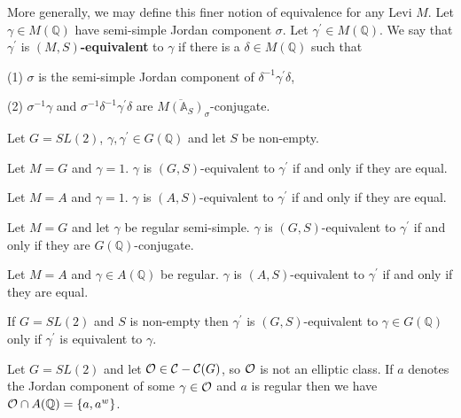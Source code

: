 More generally, we may define this
finer notion of equivalence for any Levi $M$. Let
$\gamma \in M({\mathbb{Q}})$ have semi-simple Jordan
component $\sigma$. Let $\gamma ^{\prime }\in M({\mathbb{Q}})$.
We say that $\gamma ^{\prime }$
is $(M,S)${\bf -equivalent} to $\gamma $ if there is a
$\delta \in M({\mathbb{Q}})$ such that

(1) $\sigma $ is the semi-simple Jordan component of
$\delta ^{-1}\gamma^{\prime }\delta $,

(2) $\sigma ^{-1}\gamma $ and $\sigma ^{-1}\delta ^{-1}
\gamma ^{\prime}\delta $ are
$\overline{M({\mathbb{A}}_{S})}_\sigma$-conjugate.

\begin{example}
Let $G=SL(2)$, $\gamma,\gamma^{\prime}\in G({\mathbb{Q}})$
and let $S$ be non-empty.

Let $M=G$ and $\gamma =1$. $\gamma$ is $(G,S)$-equivalent to
$\gamma^{\prime}$ if and only if they are equal.

Let $M=A$ and $\gamma =1$. $\gamma$ is $(A,S)$-equivalent to
$\gamma^{\prime}$ if and only if they are equal.

Let $M=G$ and let $\gamma $ be regular semi-simple.
$\gamma$ is $(G,S)$-equivalent to
$\gamma^{\prime}$ if and only if they are $G({\mathbb{Q}})$-conjugate.

Let $M=A$ and $\gamma \in A({\mathbb{Q}})$ be regular.
$\gamma$ is $(A,S)$-equivalent to
$\gamma^{\prime}$ if and only if they are equal.
\end{example}

\begin{lemma}
If $G=SL(2)$ and $S$ is non-empty then
$\gamma^{\prime}$ is $(G,S)$-equivalent to $\gamma\in G({\mathbb{Q}})$ only if 
$\gamma^{\prime}$ is equivalent to $\gamma$.
\end{lemma}

\begin{example}
Let $G=SL(2)$ and let ${\cal{O}}\in {\cal C}-{\cal C}(G)$, so
${\cal{O}}$ is not an elliptic class. If $a$ denotes the Jordan component of
some $\gamma \in {\cal{O}}$ and $a$ is regular then we have
${\cal{O}}\cap A({\mathbb{Q}})=\{a,a^w\}$.
\end{example}

